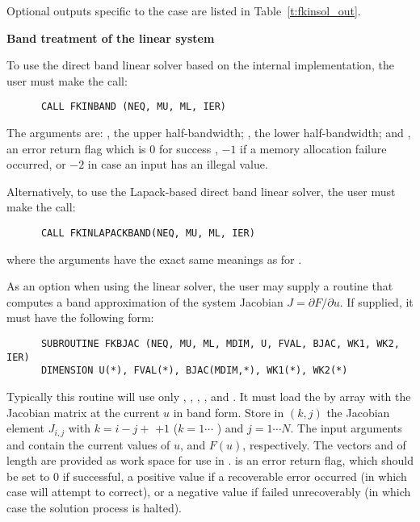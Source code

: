 \begin{Steps}
  Optional outputs specific to the {\dense} case are listed in
  Table~\ref{t:fkinsol_out}.


  {\s} {\bf Band treatment of the linear system}
  
  To use the direct band linear solver based on the internal {\kinsol}
  implementation, the user must make the call:
\begin{verbatim}
      CALL FKINBAND (NEQ, MU, ML, IER)
\end{verbatim}
  The arguments are: , the upper half-bandwidth; , 
  the lower half-bandwidth; and , an error return flag which is 
  $0$ for success , $-1$ if a memory allocation failure occurred, or $-2$ 
  in case an input has an illegal value.     
  
  Alternatively, to use the Lapack-based direct band linear solver, 
  the user must make the call:
\begin{verbatim}
      CALL FKINLAPACKBAND(NEQ, MU, ML, IER)
\end{verbatim}
  where the arguments have the exact same meanings as for .

  As an option when using the {\band} linear solver, the user may supply a
  routine that computes a band approximation of the system Jacobian 
  $J = \partial F / \partial u$. If supplied, it must have the following form:
\begin{verbatim}
      SUBROUTINE FKBJAC (NEQ, MU, ML, MDIM, U, FVAL, BJAC, WK1, WK2, IER)
      DIMENSION U(*), FVAL(*), BJAC(MDIM,*), WK1(*), WK2(*)
\end{verbatim}
  Typically this routine will use only , , ,
  , and .
  It must load the  by  array  with the Jacobian matrix
  at the current $u$ in band form.  Store in $(k,j)$ the Jacobian
  element $J_{i,j}$ with $k = i - j + $  $ + 1$ ($k = 1 \cdots $
  ) and $j = 1 \cdots N$.
  The input arguments  and  contain the current
  values of $u$, and $F(u)$, respectively.
  The vectors  and 
  of length  are provided as work space for use in
  .
   is an error return flag, which should be set to $0$ if successful,
  a positive value if a recoverable error occurred (in which case {\kinsol} will
  attempt to correct), or a negative value if  failed unrecoverably
  (in which case the solution process is halted).


\end{Steps}
